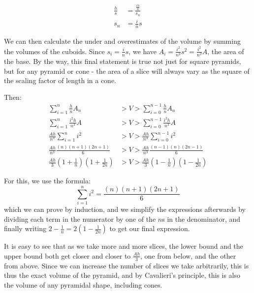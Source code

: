 \documentclass{article}
\begin{document}
\begin{align*}
\frac{h}{s} &= \frac{\frac{ih}{n}}{s_n} \\
s_n &=\frac{i}{n}s 
\end{align*}

We can then calculate the under and overestimates of the volume by summing the volumes of the
cuboids. Since $s_i = \frac{i}{n}s$, we have $A_i = \frac{i^2}{n^2}s^2 = \frac{i^2}{n^2}A$,
the area of the base. By the way, this final statement is true not just for square pyramids, but
for any pyramid or cone - the area of a slice will always vary as the square of the scaling
factor of length in a cone.

Then:
\begin{align*}
\sum_{i=1}^{n} \frac{h}{n}A_n &> V > \sum_{i=0}^{n-1} \frac{h}{n}A_n \\
\sum_{i=1}^{n} \frac{i^2h}{n^3}A &> V > \sum_{i=0}^{n-1} \frac{i^2h}{n^3}A \\
\frac{Ah}{n^3} \sum_{i=1}^{n} i^2 &> V > \frac{Ah}{n^3} \sum_{i=0}^{n-1} i^2 \\
\frac{Ah}{n^3} \frac{(n)(n+1)(2n+1)}{6} &> V > \frac{Ah}{n^3} \frac{(n-1)(n)(2n-1)}{6} \\
\frac{Ah}{3} (1+\frac{1}{n})(1+\frac{1}{2n}) &> V > \frac{Ah}{3} (1-\frac{1}{n})(1-\frac{1}{2n})
\end{align*}

For this, we use the formula:
\[ \sum_{i=1}^{n} i^2 = \frac{(n)(n+1)(2n+1)}{6} \]
which we can prove by induction, and we simplify the expressions afterwards by dividing each term
in the numerator by one of the $n$s in the denominator, and finally writing $2-\frac{1}{n} = 2(1-\frac{1}{2n})$ to get our final expression.

It is easy to see that as we take more and more slices, the lower bound and the upper bound both
get closer and closer to $\frac{Ah}{3}$, one from below, and the other from above. Since we can
increase the number of slices we take arbitrarily, this is thus the exact volume of the pyramid,
and by Cavalieri's principle, this is also the volume of any pyramidal shape, including cones.
\end{document}
